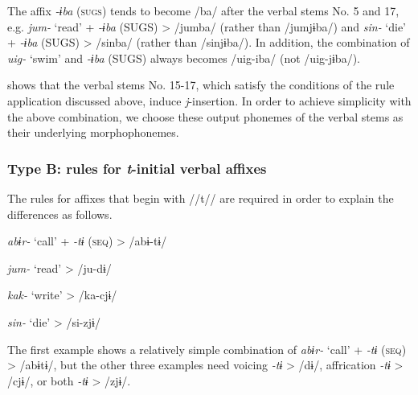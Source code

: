 The affix \textit{{}-ɨba} (\textsc{sugs}) tends to become /ba/ after the verbal stems No. 5 and 17, e.g. \textit{jum-} ‘read’ + \textit{{}-ɨba} (SUGS) > /jumba/ (rather than /jumjɨba/) and \textit{sin-} ‘die’ + \textit{{}-ɨba} (SUGS) > /sinba/ (rather than /sinjɨba/). In addition, the combination of \textit{uig-} ‘swim’ and \textit{{}-ɨba} (SUGS) always becomes /uig-iba/ (not /uig-jɨba/).

 shows that the verbal stems No. 15-17, which satisfy the conditions of the rule application discussed above, induce \textit{j}{}-insertion. In order to achieve simplicity with the above combination, we choose these output phonemes of the verbal stems as their underlying morphophonemes.

\subsubsection{Type B: rules for \textit{t}{}-initial verbal affixes}
\label{bkm:Ref347175824}
The rules for affixes that begin with //t// are required in order to explain the differences as follows.

\ea\label{ex:8-12}
\ea \textit{abɨr-}  ‘call’  +  \textit{{}-tɨ} (\textsc{seq})  >  /abɨ-tɨ/

\ex \textit{jum-}  ‘read’        >  /ju-dɨ/

\ex \textit{kak-}  ‘write’        >  /ka-cjɨ/

\ex \textit{sin-}  ‘die’        >  /si-zjɨ/
\z
\z

The first example shows a relatively simple combination of \textit{abɨr-} ‘call’ + \textit{{}-tɨ} (\textsc{seq}) > /abɨtɨ/, but the other three examples need voicing \textit{{}-tɨ} > /dɨ/, affrication \textit{{}-tɨ} > /cjɨ/, or both \textit{{}-tɨ} > /zjɨ/.

